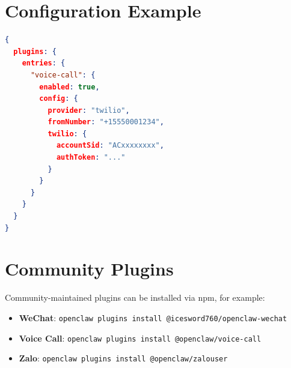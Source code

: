 \section{Configuration Example}

\begin{lstlisting}[language=json]
{
  plugins: {
    entries: {
      "voice-call": {
        enabled: true,
        config: {
          provider: "twilio",
          fromNumber: "+15550001234",
          twilio: {
            accountSid: "ACxxxxxxxx",
            authToken: "..."
          }
        }
      }
    }
  }
}
\end{lstlisting}

\section{Community Plugins}

Community-maintained plugins can be installed via npm, for example:

\begin{itemize}
  \item \textbf{WeChat}: \texttt{openclaw plugins install @icesword760/openclaw-wechat}
  \item \textbf{Voice Call}: \texttt{openclaw plugins install @openclaw/voice-call}
  \item \textbf{Zalo}: \texttt{openclaw plugins install @openclaw/zalouser}
\end{itemize}
